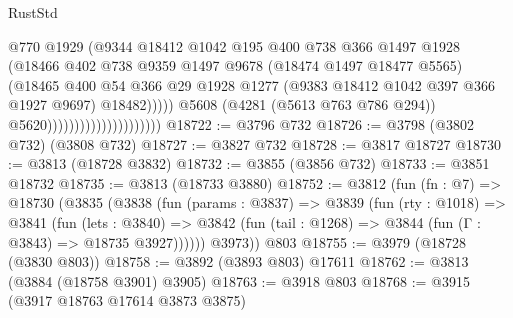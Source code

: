 \begin{lexlean}{RustStd}
\begin{coremodule}
{\begin{coremodule}
{{{{{{{{{{{{{{{{{{{{{{{{{{{{{{{{{{{                                                  @770
                                                  @1929
                                                  (@9344
                                                    @18412
                                                    @1042
                                                    @195
                                                    @400
                                                    @738
                                                    @366
                                                    @1497
                                                    @1928
                                                    (@18466
                                                      @402
                                                      @738
                                                      @9359
                                                      @1497
                                                      @9678
                                                      (@18474 @1497 @18477 @5565)
                                                      (@18465
                                                        @400
                                                        @54
                                                        @366
                                                        @29
                                                        @1928
                                                        @1277
                                                        (@9383 @18412 @1042 @397 @366 @1927 @9697)
                                                        @18482)))))
                                              @5608
                                              (@4281 (@5613 @763 @786 @294))
                                              @5620)))))))))))))))))))))
@18722 := @3796 @732
@18726 := @3798 (@3802 @732) (@3808 @732)
@18727 := @3827 @732
@18728 := @3817 @18727
@18730 := @3813 (@18728 @3832)
@18732 := @3855 (@3856 @732)
@18733 := @3851 @18732
@18735 := @3813 (@18733 @3880)
@18752 := @3812
    (fun (fn : @7) =>
    @18730
      (@3835
        (@3838
          (fun (params : @3837) =>
          @3839
            (fun (rty : @1018) =>
            @3841
              (fun (lets : @3840) =>
              @3842 (fun (tail : @1268) => @3844 (fun (Γ : @3843) => @18735 @3927))))))
        @3973))
    @803
@18755 := @3979 (@18728 (@3830 @803))
@18758 := @3892 (@3893 @803) @17611
@18762 := @3813 (@3884 (@18758 @3901) @3905)
@18763 := @3918 @803
@18768 := @3915 (@3917 @18763 @17614 @3873 @3875)
}}}}}}}}}}}}}}}}}}}}}}}}}}}}}}}}}}}
\end{coremodule}}
\end{coremodule}
\end{lexlean}
